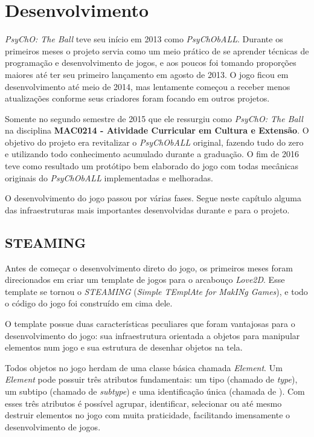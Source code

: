 \chapter{Desenvolvimento}
\label{cap:desenvolvimento}

\textit{PsyChO: The Ball} teve seu início em 2013 como \textit{PsyChObALL}. Durante os primeiros meses o projeto servia como um meio prático de se aprender técnicas de programação e desenvolvimento de jogos, e aos poucos foi tomando proporções maiores até ter seu primeiro lançamento em agosto de 2013. O jogo ficou em desenvolvimento até meio de 2014, mas lentamente começou a receber menos atualizações conforme seus criadores foram focando em outros projetos.

Somente no segundo semestre de 2015 que ele ressurgiu como \textit{PsyChO: The Ball} na disciplina \textbf{MAC0214 - Atividade Curricular em Cultura e Extensão}. O objetivo do projeto era revitalizar o \textit{PsyChObALL} original, fazendo tudo do zero e utilizando todo conhecimento acumulado durante a graduação. O fim de 2016 teve como resultado um protótipo bem elaborado do jogo com todas mecânicas originais do \textit{PsyChObALL} implementadas e melhoradas.

O desenvolvimento do jogo passou por várias fases. Segue neste capítulo alguma das infraestruturas mais importantes desenvolvidas durante e para o projeto.

\section{STEAMING}
\label{sec:steaming}

Antes de começar o desenvolvimento direto do jogo, os primeiros meses foram direcionados em criar um template de jogos para o arcabouço \textit{Love2D}. Esse template se tornou o \textit{STEAMING} (\textit{Simple TEmplAte for MakINg Games}), e todo o código do jogo foi construído em cima dele.

O template possue duas características peculiares que foram vantajosas para o desenvolvimento do jogo: sua infraestrutura orientada a objetos para manipular elementos num jogo e sua estrutura de desenhar objetos na tela.

Todos objetos no jogo herdam de uma classe básica chamada \textit{Element}. Um \textit{Element} pode possuir três atributos fundamentais: um tipo (chamado de \textit{type}), um subtipo (chamado de \textit{subtype}) e uma identificação única (chamada de ). Com esses três atributos é possível agrupar, identificar, selecionar ou até mesmo destruir elementos no jogo com muita praticidade, facilitando imensamente o desenvolvimento de jogos.

